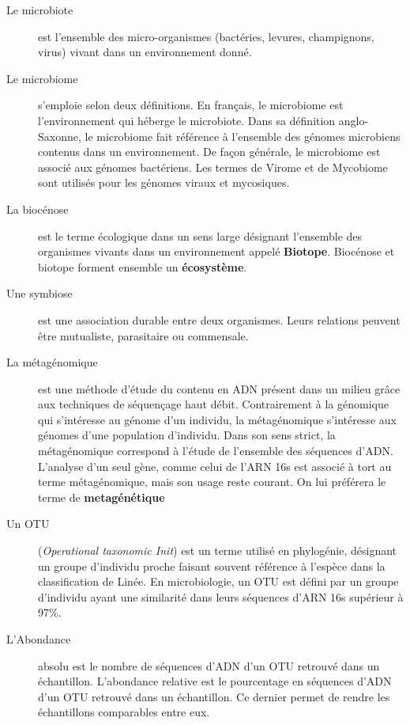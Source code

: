 \documentclass[12pt,a4paper]{article}
\begin{document}
\begin{description}
  \item[Le microbiote] est l’ensemble des micro-organismes (bactéries, levures, champignons, virus) vivant dans un environnement donné.
  
\item[Le microbiome] s’emploie selon deux définitions. En français, le microbiome est l'environnement qui héberge le microbiote. Dans sa définition anglo-Saxonne, le microbiome fait référence à l’ensemble des génomes microbiens contenus dans un environnement. 
De façon générale, le microbiome est associé aux génomes bactériens. Les termes de Virome et de Mycobiome sont utilisés pour les génomes viraux et mycosiques. 

\item[La biocénose] est le terme écologique dans un sens large désignant l'ensemble des organismes vivants dans un environnement appelé \textbf{Biotope}. Biocénose et biotope forment ensemble un \textbf{écosystème}.

\item[Une symbiose] est une association durable entre deux organismes. Leurs relations peuvent être mutualiste, parasitaire ou commensale.

\item[La métagénomique] est une méthode d’étude du contenu en ADN présent dans un milieu grâce aux techniques de séquençage haut débit. Contrairement à la génomique qui s’intéresse au génome d’un individu, la métagénomique s’intéresse aux génomes d’une population d’individu.
Dans son sens strict, la métagénomique correspond à l’étude de l’ensemble des séquences d'ADN. L’analyse d’un seul gène, comme celui de l’ARN 16s est associé à tort au terme métagénomique, mais son usage reste courant. On lui préférera le terme de \textbf{metagénétique}



\item[Un OTU] (\textit{Operational taxonomic Init}) est un terme utilisé en phylogénie, désignant un groupe d’individu proche faisant souvent référence à l’espèce dans la classification de Linée.
En microbiologie, un OTU est défini par un groupe d’individu ayant une similarité dans leurs séquences d'ARN 16s supérieur à 97\%.

\item[L'Abondance] absolu est le nombre de séquences d'ADN d'un OTU retrouvé dans un échantillon. 
L’abondance relative est le pourcentage en séquences d'ADN d'un OTU retrouvé dans un échantillon. Ce dernier permet de rendre les échantillons comparables entre eux.


\end{description}
\end{document}
